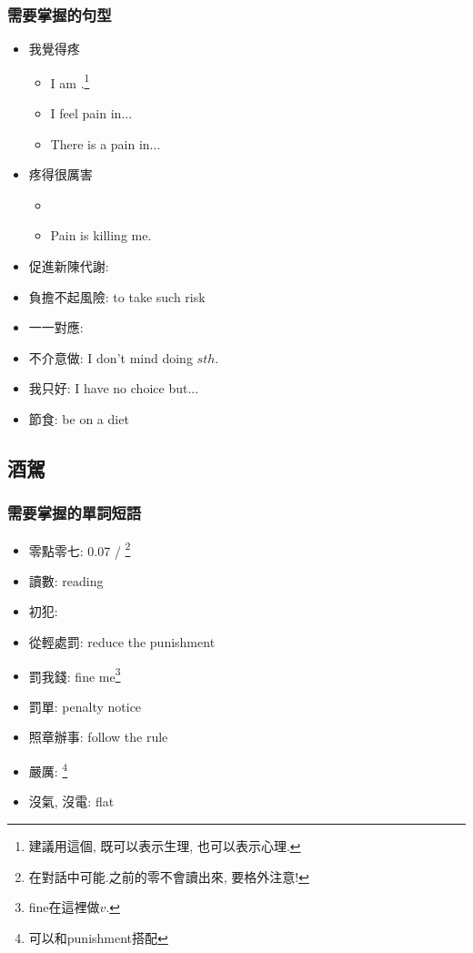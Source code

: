 \subsubsection*{需要掌握的句型}
\begin{multicols}{2}
\begin{itemize}
  \itemsep0em
  \item 我覺得疼
  \begin{itemize}
  \itemsep0em
  	\item I am .\footnote{建議用這個, 既可以表示生理, 也可以表示心理.}
  	\item I feel pain in...
  	\item There is a pain in...
  \end{itemize}
  \item 疼得很厲害
  \begin{itemize}
  \itemsep0em
  	\item {}
  	\item Pain is killing me.
  \end{itemize}
  \item 促進新陳代謝: 
  \item 負擔不起風險:  to take such risk
  \item 一一對應: 
  \item 不介意做: I don't mind doing $sth.$
  \item 我只好: I have no choice but...
  \item 節食: be on a diet
\end{itemize}
\end{multicols}

\subsection{酒駕}
\subsubsection*{需要掌握的單詞短語}
\begin{multicols}{3}
\begin{itemize}
  \itemsep0em
  \item 零點零七: 0.07 / \footnote{在對話中可能.之前的零不會讀出來, 要格外注意!}
  \item 讀數: reading
  \item 初犯: 
  \item 從輕處罰: reduce the punishment
  \item 罰我錢: fine me\footnote{fine在這裡做$v.$}
  \item 罰單: penalty notice
  \item 照章辦事: follow the rule
  \item 嚴厲: \footnote{可以和punishment搭配}
  \item 沒氣, 沒電: flat
\end{itemize}
\end{multicols}

